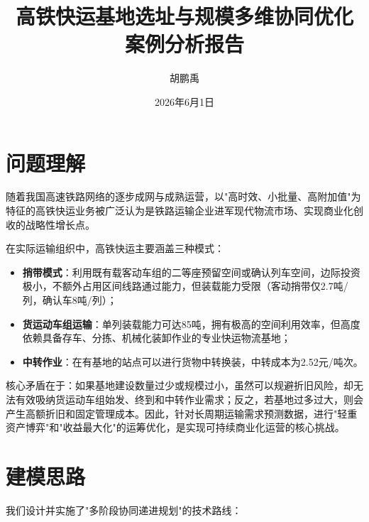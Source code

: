 \documentclass[12pt,a4paper,fontset=none]{ctexart}
\title{\heiti\zihao{2} 高铁快运基地选址与规模多维协同优化\\案例分析报告}
\author{\kaishu\zihao{4} 胡鹏禹}
\date{\zihao{4} 2026年6月1日}
\begin{document}
\maketitle
\thispagestyle{empty}

\newpage
\tableofcontents
\newpage

\section{问题理解}

随着我国高速铁路网络的逐步成网与成熟运营，以"高时效、小批量、高附加值"为特征的高铁快运业务被广泛认为是铁路运输企业进军现代物流市场、实现商业化创收的战略性增长点。

在实际运输组织中，高铁快运主要涵盖三种模式：
\begin{itemize}
    \item \textbf{捎带模式}：利用既有载客动车组的二等座预留空间或确认列车空间，边际投资极小，不额外占用区间线路通过能力，但装载能力受限（客动捎带仅2.7吨/列，确认车8吨/列）；
    \item \textbf{货运动车组运输}：单列装载能力可达85吨，拥有极高的空间利用效率，但高度依赖具备存车、分拣、机械化装卸作业的专业快运物流基地；
    \item \textbf{中转作业}：在有基地的站点可以进行货物中转换装，中转成本为2.52元/吨次。
\end{itemize}

核心矛盾在于：如果基地建设数量过少或规模过小，虽然可以规避折旧风险，却无法有效吸纳货运动车组始发、终到和中转作业需求；反之，若基地过多过大，则会产生高额折旧和固定管理成本。因此，针对长周期运输需求预测数据，进行"轻重资产博弈"和"收益最大化"的运筹优化，是实现可持续商业化运营的核心挑战。

\section{建模思路}

我们设计并实施了"多阶段协同递进规划"的技术路线：
\end{document}
